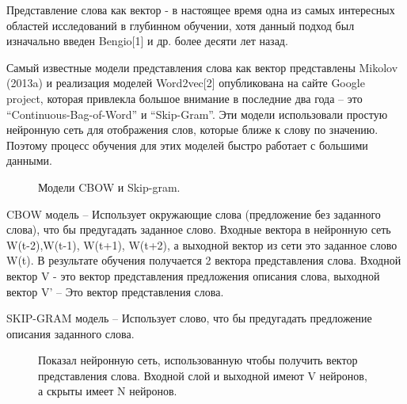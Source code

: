 \documentclass[12pt]{article}
\begin{document}
Представление слова как вектор - в настоящее время одна из самых интересных областей исследований в глубинном обучении, хотя данный подход был изначально введен Bengio[1] и др. более десяти лет назад.

	Самый известные модели представления слова как вектор представлены Mikolov (2013a) и реализация моделей Word2vec[2] опубликована на сайте Google project, которая привлекла большое внимание в последние два года – это “Continuous-Bag-of-Word” и “Skip-Gram”. Эти модели использовали простую нейронную сеть для отображения слов, которые ближе к слову по значению. Поэтому процесс обучения для этих моделей быстро работает с большими данными. 
	
	\begin{figure}[H]
		\noindent{}
		\caption{Модели CBOW и Skip-gram.}
		\label{figCurves}
	\end{figure}
	
CBOW модель – Использует окружающие слова (предложение без заданного слова), что бы предугадать заданное слово. Входные вектора в нейронную сеть W(t-2),W(t-1), W(t+1), W(t+2), а выходной вектор из сети это заданное слово W(t). В результате обучения получается 2 вектора представления слова. Входной вектор V - это вектор представления предложения описания слова, выходной вектор V’ – Это вектор представления слова.

SKIP-GRAM модель – Использует слово, что бы предугадать предложение описания заданного слова.

 	\begin{figure}[H]
		\noindent{}
		\caption{Показал нейронную сеть, использованную чтобы получить вектор представления слова. Входной слой и выходной имеют V нейронов, а скрыты имеет N нейронов.}
		\label{figCurves}
	\end{figure}
\end{document}

